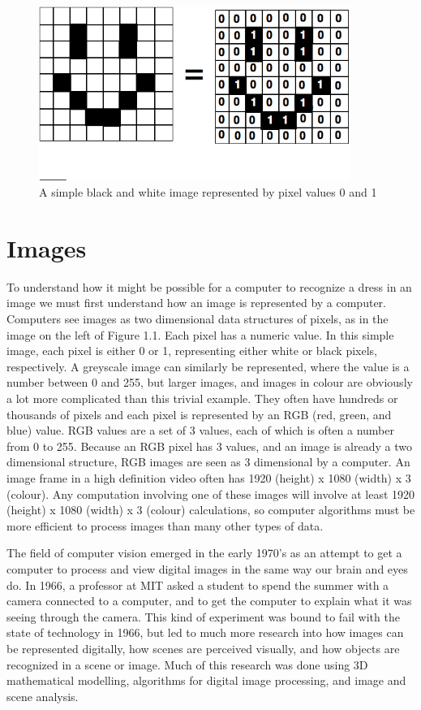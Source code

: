 \documentclass[12pt]{report} %
\begin{document}
\begin{figure}
\centering
\includegraphics[width=4in]{pixels} 
\caption{A simple black and white image represented by pixel values 0 and 1}
\label{fig: Binary Image}
\end{figure}
	
\section{Images}
	To understand how it might be possible for a computer to recognize a dress in an image we must first understand how an image is represented by a computer. Computers see images as two dimensional data structures of pixels, as in the image on the left of Figure 1.1. Each pixel has a numeric value. In this simple image, each pixel is either 0 or 1, representing either white or black pixels, respectively. A greyscale image can similarly be represented, where the value is a number between 0 and 255, but larger images, and images in colour are obviously a lot more complicated than this trivial example. They often have hundreds or thousands of pixels and each pixel is represented by an RGB (red, green, and blue) value. RGB values are a set of 3 values, each of which is often a number from 0 to 255. Because an RGB pixel has 3 values, and an image is already a two dimensional structure, RGB images are seen as 3 dimensional by a computer. An image frame in a high definition video often has 1920 (height) x 1080 (width) x 3 (colour). Any computation involving one of these images will involve at least 1920 (height) x 1080 (width) x 3 (colour) calculations, so computer algorithms must be more efficient to process images than many other types of data\cite{szeliski2010computer}. 

	The field of computer vision emerged in the early 1970's as an attempt to get a computer to process and view digital images in the same way our brain and eyes do. In 1966, a professor at MIT asked a student to spend the summer with a camera connected to a computer, and to get the computer to explain what it was seeing through the camera. This kind of experiment was bound to fail with the state of technology in 1966, but led to much more research into how images can be represented digitally, how scenes are perceived visually, and how objects are recognized in a scene or image. Much of this research was done using 3D mathematical modelling, algorithms for digital image processing, and image and scene analysis\cite{szeliski2010computer}. 
\end{document}
